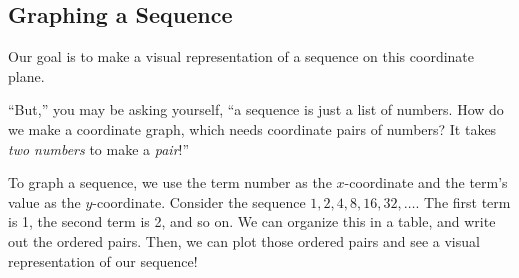 \subsection{Graphing a Sequence}

Our goal is to make a visual representation of a sequence on this coordinate plane.

``But,'' you may be asking yourself, ``a sequence is just a list of numbers. How do we make a coordinate graph, which needs coordinate pairs of numbers? It takes \textit{two numbers} to make a \textit{pair}!''


To graph a sequence, we use the term number as the $x$-coordinate and the term's value as the $y$-coordinate. Consider the sequence $1, 2, 4, 8, 16, 32,\dotsc$. The first term is 1, the second term is 2, and so on. We can organize this in a table, and write out the ordered pairs. Then, we can plot those ordered pairs and see a visual representation of our sequence!


